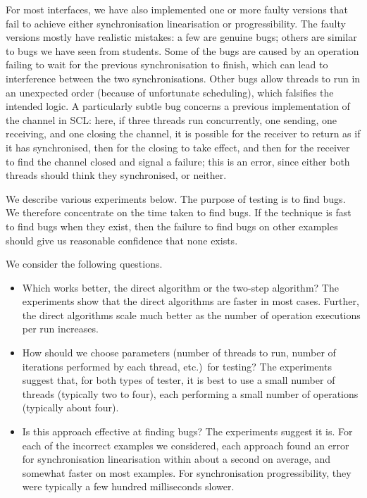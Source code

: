 For most interfaces, we have also implemented one or more faulty versions that
fail to achieve either synchronisation linearisation or progressibility.  The
faulty versions mostly have realistic mistakes: a few are genuine bugs; others
are similar to bugs we have seen from students.  Some of the bugs are caused
by an operation failing to wait for the previous synchronisation to finish,
which can lead to interference between the two synchronisations.  Other bugs
allow threads to run in an unexpected order (because of unfortunate
scheduling), which falsifies the intended logic.  A particularly subtle bug
concerns a previous implementation of the channel in SCL: here, if three
threads run concurrently, one sending, one receiving, and one closing the
channel, it is possible for the receiver to return as if it has synchronised,
then for the closing to take effect, and then for the receiver to find the
channel closed and signal a failure; this is an error, since either both
threads should think they synchronised, or neither.  




We describe various experiments below.  The purpose of testing is to find
bugs.  We therefore concentrate on the time taken to find bugs.  If the
technique is fast to find bugs when they exist, then the failure to find bugs
on other examples should give us reasonable confidence that none exists.

We consider the following questions.
\begin{itemize}
\item Which works better, the direct algorithm or the two-step algorithm?  The
  experiments show that the direct algorithms are faster in most cases.
  Further, the direct algorithms scale much better as the number of operation
  executions per run increases.

\item How should we choose parameters (number of threads to run, number of
  iterations performed by each thread, etc.)\ for testing?  The experiments
  suggest that, for both types of tester, it is best to use a  small
  number of threads (typically two to four), each performing a small number of
  operations (typically about four).    

\item Is this approach effective at finding bugs?  The experiments suggest it
  is.  For each of the incorrect examples we considered, each approach found
  an error for synchronisation linearisation within about a second on average,
  and somewhat faster on most examples.  For synchronisation progressibility,
  they were typically a few hundred milliseconds slower.
\end{itemize}

